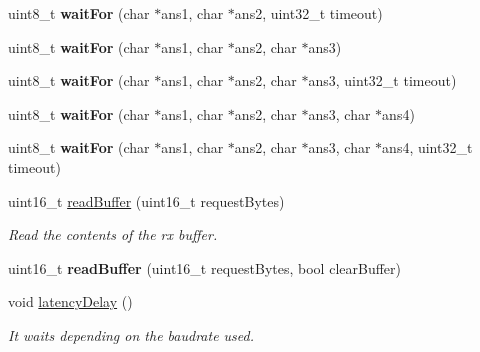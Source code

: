\begin{DoxyCompactItemize}
\item 
uint8\+\_\+t {\bfseries wait\+For} (char $\ast$ans1, char $\ast$ans2, uint32\+\_\+t timeout)\hypertarget{class_wasp_u_a_r_t_a462c19311f2d5916b68624fb0d2ba9c7}{}\label{class_wasp_u_a_r_t_a462c19311f2d5916b68624fb0d2ba9c7}

\item 
uint8\+\_\+t {\bfseries wait\+For} (char $\ast$ans1, char $\ast$ans2, char $\ast$ans3)\hypertarget{class_wasp_u_a_r_t_a2152bbb55c3db5021a81d1393fd7064a}{}\label{class_wasp_u_a_r_t_a2152bbb55c3db5021a81d1393fd7064a}

\item 
uint8\+\_\+t {\bfseries wait\+For} (char $\ast$ans1, char $\ast$ans2, char $\ast$ans3, uint32\+\_\+t timeout)\hypertarget{class_wasp_u_a_r_t_ae888dbe9f95d1c8627a8b6cd0914fe84}{}\label{class_wasp_u_a_r_t_ae888dbe9f95d1c8627a8b6cd0914fe84}

\item 
uint8\+\_\+t {\bfseries wait\+For} (char $\ast$ans1, char $\ast$ans2, char $\ast$ans3, char $\ast$ans4)\hypertarget{class_wasp_u_a_r_t_a697a68a83daa0e3d5abfe9fd5c1c5f86}{}\label{class_wasp_u_a_r_t_a697a68a83daa0e3d5abfe9fd5c1c5f86}

\item 
uint8\+\_\+t {\bfseries wait\+For} (char $\ast$ans1, char $\ast$ans2, char $\ast$ans3, char $\ast$ans4, uint32\+\_\+t timeout)\hypertarget{class_wasp_u_a_r_t_ad7eff8d57ae0f5855bf59ac6f2d34e73}{}\label{class_wasp_u_a_r_t_ad7eff8d57ae0f5855bf59ac6f2d34e73}

\item 
uint16\+\_\+t \hyperlink{class_wasp_u_a_r_t_ab5f61d0ce296ce27364372876111f3d7}{read\+Buffer} (uint16\+\_\+t request\+Bytes)\hypertarget{class_wasp_u_a_r_t_ab5f61d0ce296ce27364372876111f3d7}{}\label{class_wasp_u_a_r_t_ab5f61d0ce296ce27364372876111f3d7}

\begin{DoxyCompactList}\small\item\em Read the contents of the rx buffer. \end{DoxyCompactList}\item 
uint16\+\_\+t {\bfseries read\+Buffer} (uint16\+\_\+t request\+Bytes, bool clear\+Buffer)\hypertarget{class_wasp_u_a_r_t_a969be443a99867ac8edacc4a43b4269e}{}\label{class_wasp_u_a_r_t_a969be443a99867ac8edacc4a43b4269e}

\item 
void \hyperlink{class_wasp_u_a_r_t_afb5edf3c4b981187903c427de6a91573}{latency\+Delay} ()\hypertarget{class_wasp_u_a_r_t_afb5edf3c4b981187903c427de6a91573}{}\label{class_wasp_u_a_r_t_afb5edf3c4b981187903c427de6a91573}

\begin{DoxyCompactList}\small\item\em It waits depending on the baudrate used. \end{DoxyCompactList}\end{DoxyCompactItemize}
